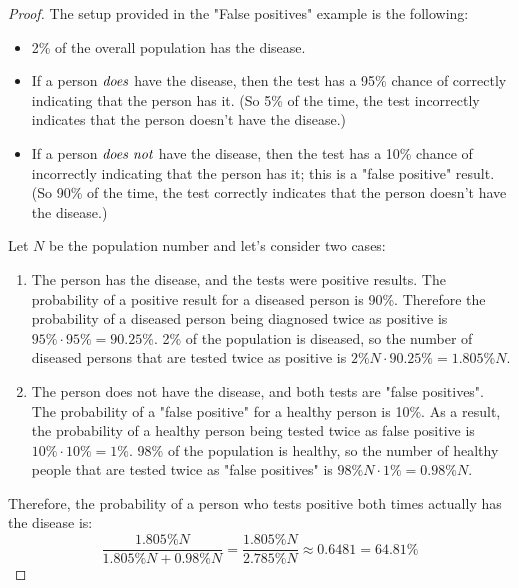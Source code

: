 \begin{proof}
    The setup provided in the "False positives" example is the following:
    \begin{itemize}
        \item 2\% of the overall population has the disease.

        \item If a person $\emph{does}$ have the disease, then the test has a 95\% chance of correctly
            indicating that the person has it. (So 5\% of the time, the test incorrectly indicates
            that the person doesn't have the disease.)

        \item If a person $\emph{does not}$ have the disease, then the test has a 10\% chance of
            incorrectly indicating that the person has it; this is a "false positive" result.
            (So 90\% of the time, the test correctly indicates that the person doesn't have the 
            disease.)
    \end{itemize}

    Let $N$ be the population number and let's consider two cases:
    \begin{enumerate}
        \item The person has the disease, and the tests were positive results.
            The probability of a positive result for a diseased person is 90\%.
            Therefore the probability of a diseased person being diagnosed twice
            as positive is $95\% \cdot 95\% = 90.25\%$. 2\% of the population is diseased,
            so the number of diseased persons that are tested twice as positive is 
            $2\%N \cdot 90.25\% = 1.805\%N$.

        \item The person does not have the disease, and both tests are "false positives".
            The probability of a "false positive" for a healthy person is 10\%.
            As a result, the probability of a healthy person being tested twice as false positive
            is $10\% \cdot 10\% = 1\%$. 98\% of the population is healthy, so the number
            of healthy people that are tested twice as "false positives" is 
            $98\%N \cdot 1\% = 0.98\%N$.
    \end{enumerate}

    Therefore, the probability of a person who tests positive both times actually has the disease
    is:
    \[
        \frac{1.805\%N}{1.805\%N + 0.98\%N} = \frac{1.805\%N}{2.785\%N} \approx 0.6481 = 64.81\%
    \] 
\end{proof}
